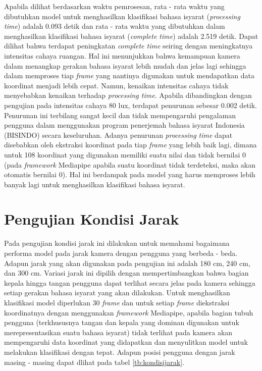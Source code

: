Apabila dilihat berdasarkan waktu pemrosesan, rata - rata waktu yang dibutuhkan model untuk menghasilkan klasifikasi bahasa isyarat (\emph{processing time}) adalah 0.093 detik dan rata - rata waktu yang dibutuhkan dalam menghasilkan klasifikasi bahasa isyarat (\emph{complete time}) adalah 2.519 detik. Dapat dilihat bahwa terdapat peningkatan \emph{complete time} seiring dengan meningkatnya intensitas cahaya ruangan. Hal ini menunjukkan bahwa kemampuan kamera dalam menangkap gerakan bahasa isyarat lebih mudah dan jelas lagi sehingga dalam memproses tiap \emph{frame} yang nantinya digunakan untuk mendapatkan data koordinat menjadi lebih cepat. Namun, kenaikan intensitas cahaya tidak menyebabkan kenaikan terhadap \emph{processing time}. Apabila dibandingkan dengan pengujian pada intensitas cahaya 80 lux, terdapat penurunan sebesar 0.002 detik. Penurunan ini terbilang sangat kecil dan tidak mempengaruhi pengalaman pengguna dalam menggunakan program penerjemah bahasa isyarat Indonesia (BISINDO) secara keseluruhan. Adanya penurunan \emph{processing time} dapat disebabkan oleh ekstraksi koordinat pada tiap \emph{frame} yang lebih baik lagi, dimana untuk 108 koordinat yang digunakan memiliki suatu nilai dan tidak bernilai 0 (pada \emph{framework} Mediapipe apabila suatu koordinat tidak terdeteksi, maka akan otomatis bernilai 0). Hal ini berdampak pada model yang harus memproses lebih banyak lagi untuk menghasilkan klasifikasi bahasa isyarat.

\section{Pengujian Kondisi Jarak}
\label{sec:analisisjarak}

Pada pengujian kondisi jarak ini dilakukan untuk memahami bagaimana performa model pada jarak kamera dengan pengguna yang berbeda - beda. Adapun jarak yang akan digunakan pada pengujian ini adalah 180 cm, 240 cm, dan 300 cm. Variasi jarak ini dipilih dengan mempertimbangkan bahwa bagian kepala hingga tangan pengguna dapat terlihat secara jelas pada kamera sehingga setiap gerakan bahasa isyarat yang akan dilakukan. Untuk menghasilkan klasifikasi model diperlukan 30 \emph{frame} dan untuk setiap \emph{frame} diekstraksi koordinatnya dengan menggunakan \emph{framework} Mediapipe, apabila bagian tubuh pengguna (terkhususnya tangan dan kepala yang dominan digunakan untuk merepresentasikan suatu bahasa isyarat) tidak terlihat pada kamera akan mempengaruhi data koordinat yang didapatkan dan menyulitkan model untuk melakukan klasifikasi dengan tepat. Adapun posisi pengguna dengan jarak masing - masing dapat dlihat pada tabel \ref{tb:kondisijarak}. 

